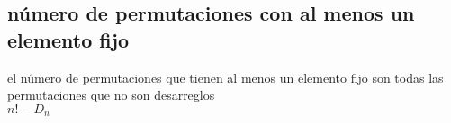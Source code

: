 \subsection{número de permutaciones con al menos un elemento fijo}
el número de permutaciones que tienen al menos un elemento fijo son todas las permutaciones que no son desarreglos\\
$n!-D_{n}$
